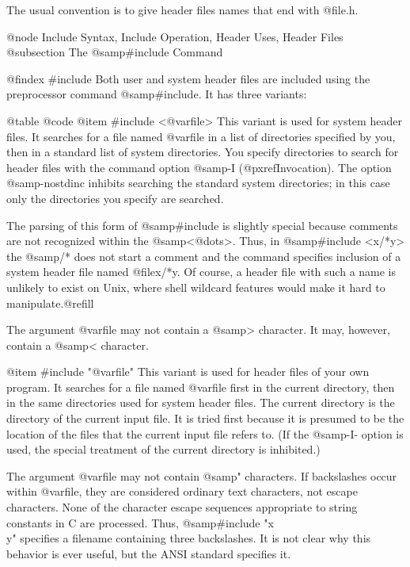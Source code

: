{The usual convention is to give header files names that end with @file{.h}.

@node Include Syntax, Include Operation, Header Uses, Header Files
@subsection The @samp{#include} Command

@findex #include
Both user and system header files are included using the preprocessor
command @samp{#include}.  It has three variants:

@table @code
@item #include <@var{file}>
This variant is used for system header files.  It searches for a file
named @var{file} in a list of directories specified by you, then in a
standard list of system directories.  You specify directories to
search for header files with the command option @samp{-I}
(@pxref{Invocation}).  The option @samp{-nostdinc} inhibits searching
the standard system directories; in this case only the directories
you specify are searched.

The parsing of this form of @samp{#include} is slightly special
because comments are not recognized within the @samp{<@dots{}>}.
Thus, in @samp{#include <x/*y>} the @samp{/*} does not start a comment
and the command specifies inclusion of a system header file named
@file{x/*y}.  Of course, a header file with such a name is unlikely to
exist on Unix, where shell wildcard features would make it hard to
manipulate.@refill

The argument @var{file} may not contain a @samp{>} character.  It may,
however, contain a @samp{<} character.

@item #include "@var{file}"
This variant is used for header files of your own program.  It
searches for a file named @var{file} first in the current directory,
then in the same directories used for system header files.  The
current directory is the directory of the current input file.  It is
tried first because it is presumed to be the location of the files
that the current input file refers to.  (If the @samp{-I-} option is
used, the special treatment of the current directory is inhibited.)

The argument @var{file} may not contain @samp{"} characters.  If
backslashes occur within @var{file}, they are considered ordinary text
characters, not escape characters.  None of the character escape
sequences appropriate to string constants in C are processed.  Thus,
@samp{#include "x\n\\y"} specifies a filename containing three
backslashes.  It is not clear why this behavior is ever useful, but
the ANSI standard specifies it.

}
